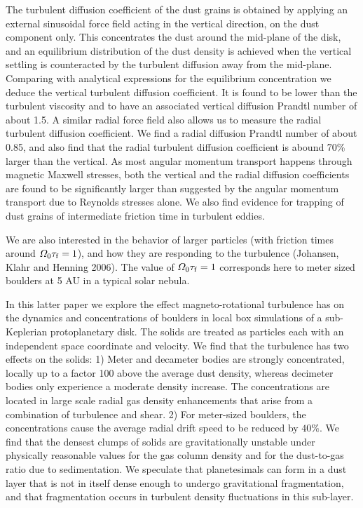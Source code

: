 The turbulent diffusion coefficient of the dust grains is obtained by
applying an external sinusoidal force field acting in the vertical
direction, on the dust component only. This concentrates the dust around the
mid-plane of the disk, and an equilibrium distribution of the dust density
is achieved when the vertical settling is counteracted by the turbulent
diffusion away from the mid-plane. Comparing with analytical expressions for
the equilibrium concentration we deduce the vertical turbulent diffusion
coefficient. It is found to be lower than
the turbulent viscosity and to have an associated vertical diffusion Prandtl
number of about 1.5. A similar radial force field also allows us to measure
the radial turbulent diffusion coefficient. We find a radial diffusion
Prandtl number of about 0.85, and also find that the radial turbulent
diffusion coefficient is abound 70\% larger than the vertical. As most
angular momentum transport happens through magnetic Maxwell stresses, both
the vertical and the radial diffusion coefficients are found to be
significantly larger than suggested by the angular momentum transport due to
Reynolds stresses alone. We also find evidence for trapping of dust grains
of intermediate friction time in turbulent eddies.

We are also interested in the behavior of larger particles (with friction
times around $\varOmega_0 \tau_{\rm f}=1$), and how they are responding to
the turbulence (Johansen, Klahr and Henning 2006).  The value of
$\varOmega_0 \tau_{\rm f} = 1$ corresponds here to meter sized boulders at 5
AU in a typical solar nebula.

In this latter paper we explore the effect magneto-rotational turbulence has
on the dynamics and concentrations of boulders in local box simulations of a
sub-Keplerian protoplanetary disk.  The solids are treated as particles each
with an independent space coordinate and velocity. We find that the
turbulence has two effects on the solids: 1) Meter and decameter bodies are
strongly concentrated, locally up to a factor 100 above the average dust
density, whereas decimeter bodies only experience a moderate density
increase. The concentrations are located in large scale radial gas density
enhancements that arise from a combination of turbulence and shear.  2) For
meter-sized boulders, the concentrations cause the average radial drift
speed to be reduced by $40\%$.  We find that the densest clumps of solids
are gravitationally unstable under physically reasonable values for the gas
column density and for the dust-to-gas ratio due to sedimentation.  We
speculate that planetesimals can form in a dust layer that is not in itself
dense enough to undergo gravitational fragmentation, and that fragmentation
occurs in turbulent density fluctuations in this sub-layer.


